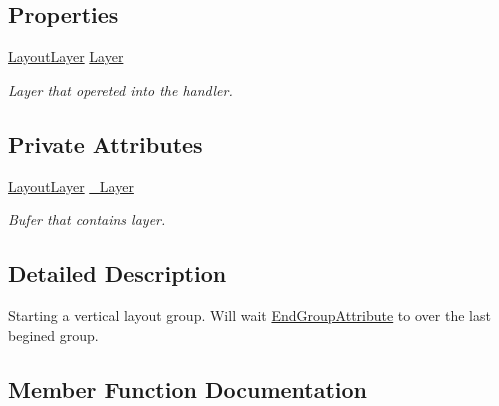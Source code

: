 \subsection*{Properties}
\begin{DoxyCompactItemize}
\item 
\mbox{\hyperlink{class_wpf_handler_1_1_u_i_1_1_auto_layout_1_1_layout_layer}{Layout\+Layer}} \mbox{\hyperlink{class_wpf_handler_1_1_u_i_1_1_auto_layout_1_1_configuration_1_1_begin_vertical_group_attribute_aba42e4648d684e4a0091d4157e58c19d}{Layer}}
\begin{DoxyCompactList}\small\item\em Layer that opereted into the handler. \end{DoxyCompactList}\end{DoxyCompactItemize}
\subsection*{Private Attributes}
\begin{DoxyCompactItemize}
\item 
\mbox{\hyperlink{class_wpf_handler_1_1_u_i_1_1_auto_layout_1_1_layout_layer}{Layout\+Layer}} \mbox{\hyperlink{class_wpf_handler_1_1_u_i_1_1_auto_layout_1_1_configuration_1_1_begin_vertical_group_attribute_ac18db79463ee3229241875a881b71c48}{\+\_\+\+Layer}}
\begin{DoxyCompactList}\small\item\em Bufer that contains layer. \end{DoxyCompactList}\end{DoxyCompactItemize}


\subsection{Detailed Description}
Starting a vertical layout group. Will wait \mbox{\hyperlink{class_wpf_handler_1_1_u_i_1_1_auto_layout_1_1_configuration_1_1_end_group_attribute}{End\+Group\+Attribute}} to over the last begined group. 



\subsection{Member Function Documentation}
\mbox{\label{class_wpf_handler_1_1_u_i_1_1_auto_layout_1_1_configuration_1_1_begin_vertical_group_attribute_a52859bc4d83f107cbae35d20ae97ce83}} 
